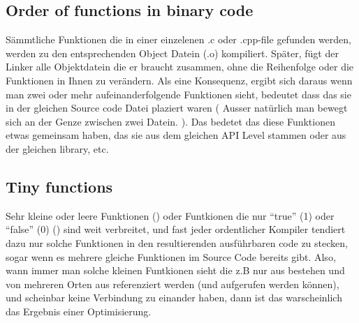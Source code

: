 
\subsection{Order of functions in binary code}

Sämmtliche Funktionen die in einer einzelenen .c oder .cpp-file gefunden werden, werden zu den entsprechenden Object Datein (.o) kompiliert. 
Später, fügt der Linker alle Objektdatein die er braucht zusammen, ohne die Reihenfolge oder die Funktionen in Ihnen zu verändern. 
Als eine Konsequenz, ergibt sich daraus wenn man zwei oder mehr aufeinanderfolgende Funktionen sieht, bedeutet dass das sie in der 
gleichen Source code Datei plaziert waren ( Ausser natürlich man bewegt sich an der Genze zwischen zwei Datein. ).  Das bedetet
das diese Funktionen etwas gemeinsam haben, das sie aus dem gleichen \ac{API} Level stammen oder aus der gleichen library, etc.


\subsection{Tiny functions}

Sehr kleine oder leere Funktionen  ()
oder Funtkionen die nur ``true'' (1) oder ``false'' (0) () sind weit verbreitet,
und fast jeder ordentlicher Kompiler tendiert dazu nur solche Funktionen in den resultierenden ausführbaren code zu stecken,
sogar wenn es mehrere gleiche Funktionen im Source Code bereits gibt. 
Also, wann immer man solche kleinen Funtkionen sieht die z.B nur aus  bestehen und von mehreren 
Orten aus referenziert werden (und aufgerufen werden können), und scheinbar keine Verbindung zu einander haben, dann 
ist das warscheinlich das Ergebnis einer Optimisierung. 

